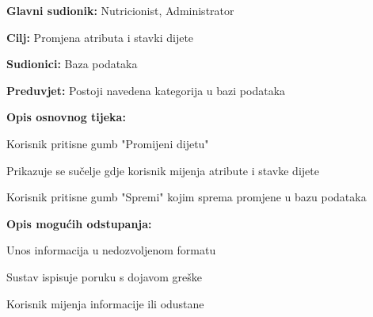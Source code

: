                     \noindent {}
                    \begin{packed_item}
    
                        \item \textbf{Glavni sudionik: }Nutricionist, Administrator
                        \item  \textbf{Cilj:} Promjena atributa i stavki dijete
                        \item  \textbf{Sudionici:} Baza podataka
                        \item  \textbf{Preduvjet:} Postoji navedena kategorija u bazi podataka
                        \item  \textbf{Opis osnovnog tijeka:} 
                        
                        \item[] \begin{packed_enum}
    
                            \item Korisnik pritisne gumb "Promijeni dijetu"
                            \item Prikazuje se sučelje gdje korisnik mijenja atribute i stavke dijete
                            \item Korisnik pritisne gumb "Spremi" kojim sprema promjene u bazu podataka
                        \end{packed_enum}
                        
                        \item  \textbf{Opis mogućih odstupanja:}
                        
                        \item[] \begin{packed_item}

                            \item[2.a] Unos informacija u nedozvoljenom formatu
                            \item[] \begin{packed_enum}
                                
                                \item Sustav ispisuje poruku s dojavom greške
                                \item Korisnik mijenja informacije ili odustane
                                
                            \end{packed_enum}

                            
                        \end{packed_item}
                    \end{packed_item}


